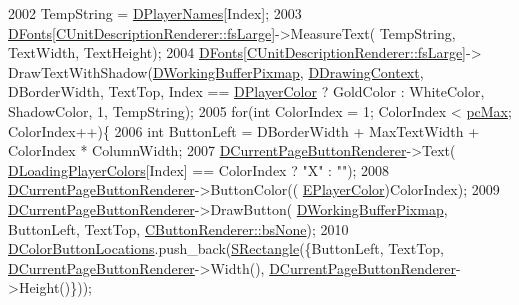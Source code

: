 \begin{DoxyCode}
2002         TempString = \hyperlink{classCApplicationData_a446d88c378b95b1a4f88071612229086}{DPlayerNames}[Index];
2003         \hyperlink{classCApplicationData_afde9247d0a3ea87393ec86dcdb1e8274}{DFonts}[\hyperlink{classCUnitDescriptionRenderer_a3ea4cd83b6dd9533ab3abb953a7da35aaf467097fe4f4811a5e2f1959c86e071d}{CUnitDescriptionRenderer::fsLarge}]->MeasureText(
      TempString, TextWidth, TextHeight);
2004         \hyperlink{classCApplicationData_afde9247d0a3ea87393ec86dcdb1e8274}{DFonts}[\hyperlink{classCUnitDescriptionRenderer_a3ea4cd83b6dd9533ab3abb953a7da35aaf467097fe4f4811a5e2f1959c86e071d}{CUnitDescriptionRenderer::fsLarge}]->
      DrawTextWithShadow(\hyperlink{classCApplicationData_afa34cf2780f38dd28c0c811e69d60a97}{DWorkingBufferPixmap}, \hyperlink{classCApplicationData_aa6c5bea9bdcc64398e5a3f693661d37c}{DDrawingContext}, DBorderWidth, TextTop, Index == 
      \hyperlink{classCApplicationData_a53550939b20cba70570f113e4d1c5d02}{DPlayerColor} ? GoldColor : WhiteColor, ShadowColor, 1, TempString);
2005         \textcolor{keywordflow}{for}(\textcolor{keywordtype}{int} ColorIndex = 1; ColorIndex < \hyperlink{GameDataTypes_8h_aafb0ca75933357ff28a6d7efbdd7602fa594a5c8dd3987f24e8a0f23f1a72cd34}{pcMax}; ColorIndex++)\{
2006             \textcolor{keywordtype}{int} ButtonLeft = DBorderWidth + MaxTextWidth + ColorIndex * ColumnWidth;
2007             \hyperlink{classCApplicationData_abfe1743f2634b069ccc811db4a8733a8}{DCurrentPageButtonRenderer}->Text(
      \hyperlink{classCApplicationData_ab29b80d90f1201608dcb498cd627a6f9}{DLoadingPlayerColors}[Index] == ColorIndex ? \textcolor{stringliteral}{"X"} : \textcolor{stringliteral}{""});
2008             \hyperlink{classCApplicationData_abfe1743f2634b069ccc811db4a8733a8}{DCurrentPageButtonRenderer}->ButtonColor((
      \hyperlink{GameDataTypes_8h_aafb0ca75933357ff28a6d7efbdd7602f}{EPlayerColor})ColorIndex);
2009             \hyperlink{classCApplicationData_abfe1743f2634b069ccc811db4a8733a8}{DCurrentPageButtonRenderer}->DrawButton(
      \hyperlink{classCApplicationData_afa34cf2780f38dd28c0c811e69d60a97}{DWorkingBufferPixmap}, ButtonLeft, TextTop, 
      \hyperlink{classCButtonRenderer_ae0eccda184600f6e14bfd59033e5e9a1aa0cd7277705307bef6c50f2250b5d62d}{CButtonRenderer::bsNone});
2010             \hyperlink{classCApplicationData_ac983034ed6e3eec382e22f1d2af25106}{DColorButtonLocations}.push\_back(\hyperlink{structSRectangle}{SRectangle}(\{ButtonLeft, TextTop,
       \hyperlink{classCApplicationData_abfe1743f2634b069ccc811db4a8733a8}{DCurrentPageButtonRenderer}->Width(), 
      \hyperlink{classCApplicationData_abfe1743f2634b069ccc811db4a8733a8}{DCurrentPageButtonRenderer}->Height()\}));

\end{DoxyCode}
